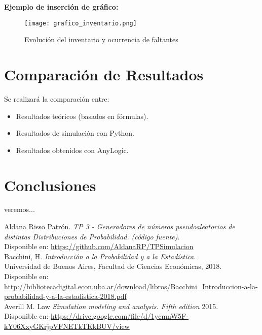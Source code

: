\documentclass{article}
\begin{document}
\vspace{1em}
\textbf{Ejemplo de inserción de gráfico:}

\begin{figure}[H]
    \centering
    \texttt{[image: grafico\_inventario.png]}
    \caption{Evolución del inventario y ocurrencia de faltantes}
\end{figure}

\section{Comparación de Resultados}

Se realizará la comparación entre:
\begin{itemize}
    \item Resultados teóricos (basados en fórmulas).
    \item Resultados de simulación con Python.
    \item Resultados obtenidos con AnyLogic.
\end{itemize}

\section{Conclusiones}

veremos...





  
\begin{thebibliography}{2}

Aldana Risso Patrón. \textit{TP 3 - Generadores de números pseudoaleatorios de distintas Distribuciones de Probabilidad. (código fuente)}.\\
Disponible en: \url{https://github.com/AldanaRP/TPSimulacion} \\

Bacchini, H. \textit{Introducción a la Probabilidad y a la Estadística}.\\
Universidad de Buenos Aires, Facultad de Ciencias Económicas, 2018.\\
Disponible en: \url{http://bibliotecadigital.econ.uba.ar/download/libros/Bacchini_Introduccion-a-la-probabilidad-y-a-la-estadistica-2018.pdf}\\

Averill M. Law \textit{Simulation modeling and analysis. Fifth edition }2015. \\
Disponible en:
\url{https://drive.google.com/file/d/1ycmnW5F-kY06XxyGKrjpVFNETkTKkBUV/view}

\end{thebibliography}
\end{document}
